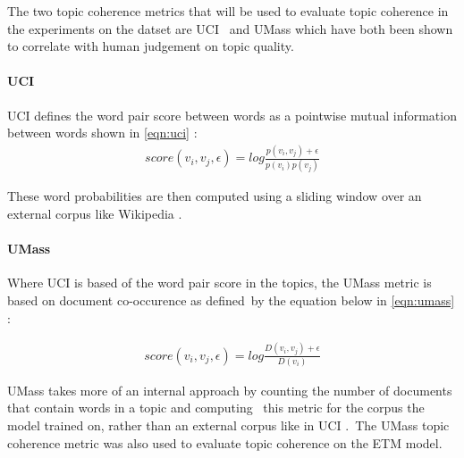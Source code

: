 \documentclass[letterpaper,12pt]{article}
\begin{document}
The two topic coherence metrics that will be used to evaluate topic coherence in the experiments on the datset are UCI \cite{newman2010automatic}\
and UMass \cite{mimno2011optimizing} which have both been shown to correlate with human judgement on topic quality.

\paragraph{UCI}
UCI defines the word pair score between words as a pointwise mutual information between words shown in \ref{eqn:uci} \cite{stevens2012exploring}:
\begin{eqnarray}
	\label{eqn:uci}
	score(v_i,v_j,\epsilon) = log \frac{p(v_i,v_j) + \epsilon}{p(v_i)p(v_j)}
\end{eqnarray}

These word probabilities are then computed using a sliding window over an external corpus like Wikipedia \cite{stevens2012exploring}.

\paragraph{UMass}
Where UCI is based of the word pair score in the topics, the UMass metric is based on document co-occurence as defined\
by the equation below in \ref{eqn:umass} \cite{mimno2011optimizing}:

\begin{eqnarray}
	\label{eqn:umass}
	score(v_i,v_j,\epsilon) = log \frac{D(v_i,v_j) + \epsilon}{D(v_i)}
\end{eqnarray}

UMass takes more of an internal approach by counting the number of documents that contain words in a topic and computing \
this metric for the corpus the model trained on, rather than an external corpus like in UCI \cite{stevens2012exploring}.\
The UMass topic coherence metric was also used to evaluate topic coherence on the ETM model.
\end{document}
